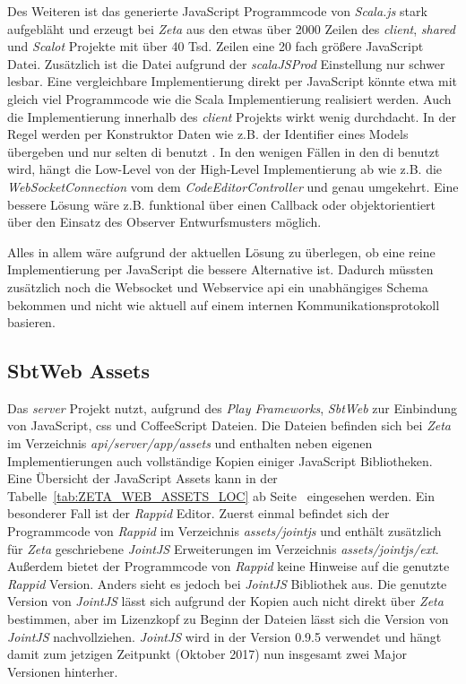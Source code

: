 Des Weiteren ist das generierte JavaScript Programmcode von \textit{Scala.js} stark aufgebläht und erzeugt bei \textit{Zeta} aus den etwas über 2000 Zeilen des \textit{client}, \textit{shared} und \textit{Scalot} Projekte mit über 40 Tsd. Zeilen eine 20 fach größere JavaScript Datei. Zusätzlich ist die Datei aufgrund der \textit{scalaJSProd} Einstellung nur schwer lesbar. Eine vergleichbare Implementierung direkt per JavaScript könnte etwa mit gleich viel Programmcode wie die Scala Implementierung realisiert werden. Auch die Implementierung innerhalb des \textit{client} Projekts wirkt wenig durchdacht. In der Regel werden per Konstruktor Daten wie z.B. der Identifier eines Models übergeben und nur selten \ac{di} benutzt \cite{zeta_client_controller}. In den wenigen Fällen in den \ac{di} benutzt wird, hängt die Low-Level von der High-Level Implementierung ab wie z.B. die \textit{WebSocketConnection} vom dem \textit{CodeEditorController} und genau umgekehrt. Eine bessere Lösung wäre z.B. funktional über einen Callback oder objektorientiert über den Einsatz des Observer Entwurfsmusters möglich.

Alles in allem wäre aufgrund der aktuellen Lösung zu überlegen, ob eine reine Implementierung per JavaScript die bessere Alternative ist. Dadurch müssten zusätzlich noch die Websocket und Webservice \ac{api} ein unabhängiges Schema bekommen und nicht wie aktuell auf einem internen Kommunikationsprotokoll basieren.

\subsection{SbtWeb Assets}

Das \textit{server} Projekt nutzt, aufgrund des \textit{Play Frameworks}, \textit{SbtWeb} zur Einbindung von JavaScript, \ac{css} und CoffeeScript Dateien. Die Dateien befinden sich bei \textit{Zeta} im Verzeichnis \textit{api/server/app/assets} und enthalten neben eigenen Implementierungen auch vollständige Kopien einiger JavaScript Bibliotheken. Eine Übersicht der JavaScript Assets kann in der Tabelle~\ref{tab:ZETA_WEB_ASSETS_LOC} ab Seite~\pageref{tab:ZETA_WEB_ASSETS_LOC} eingesehen werden. Ein besonderer Fall ist der \textit{Rappid} Editor. Zuerst einmal befindet sich der Programmcode von \textit{Rappid} im Verzeichnis \textit{assets/jointjs} und enthält zusätzlich für \textit{Zeta} geschriebene \textit{JointJS} Erweiterungen im Verzeichnis \textit{assets/jointjs/ext}. Außerdem bietet der Programmcode von \textit{Rappid} keine Hinweise auf die genutzte \textit{Rappid} Version. Anders sieht es jedoch bei \textit{JointJS} Bibliothek aus. Die genutzte Version von \textit{JointJS} lässt sich aufgrund der Kopien auch nicht direkt über \textit{Zeta} bestimmen, aber im Lizenzkopf zu Beginn der Dateien lässt sich die Version von \textit{JointJS} nachvollziehen. \textit{JointJS} wird in der Version 0.9.5 verwendet und hängt damit zum jetzigen Zeitpunkt (Oktober 2017) nun insgesamt zwei Major Versionen hinterher.

